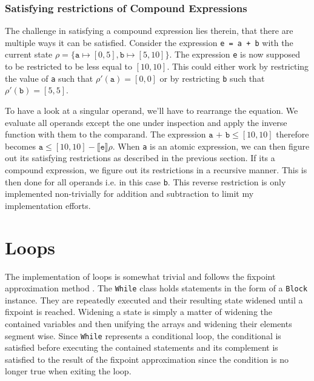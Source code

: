 \subsubsection{Satisfying restrictions of Compound Expressions}

The challenge in satisfying a compound expression lies therein, that there are multiple ways it can be satisfied. Consider the expression \texttt{e = a + b} with the current state $\rho=\{\mathtt{a}\mapsto[0,5],\mathtt{b}\mapsto[5,10]\}$. The expression \texttt{e} is now supposed to be restricted to be less equal to $[10,10]$. This could either work by restricting the value of \texttt{a} such that $\rho'(\mathtt{a})=[0,0]$ or by restricting \texttt{b} such that $\rho'(\mathtt{b})=[5,5]$.

To have a look at a singular operand, we'll have to rearrange the equation. We evaluate all operands except the one under inspection and apply the inverse function with them to the comparand. The expression $\texttt{a + b} \leq [10,10]$ therefore becomes $\texttt{a} \leq [10,10] - \llbracket\texttt{e}\rrbracket\rho$. When \texttt{a} is an atomic expression, we can then figure out its satisfying restrictions as described in the previous section. If its a compound expression, we figure out its restrictions in a recursive manner. This is then done for all operands i.e. in this case \texttt{b}. This reverse restriction is only implemented non-trivially for addition and subtraction to limit my implementation efforts. 



\section{Loops}

The implementation of loops is somewhat trivial and follows the fixpoint approximation method \cite{cousot1977}. The \texttt{While} class holds statements in the form of a \texttt{Block} instance. They are repeatedly executed and their resulting state widened until a fixpoint is reached. Widening a state is simply a matter of widening the contained variables and then unifying the arrays and widening their elements segment wise. Since \texttt{While} represents a conditional loop, the conditional is satisfied before executing the contained statements and its complement is satisfied to the result of the fixpoint approximation since the condition is no longer true when exiting the loop.

















